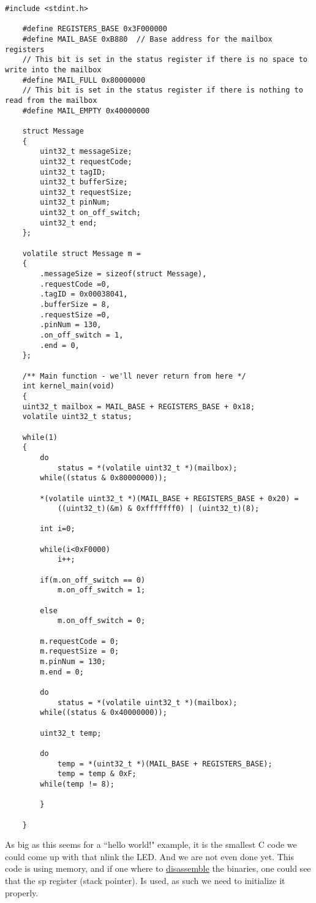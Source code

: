 \documentclass[12pt]{book}
\begin{document}
\lstset{language=C}
\begin{lstlisting}[style=C]
	#include <stdint.h>
	
	#define REGISTERS_BASE 0x3F000000
	#define MAIL_BASE 0xB880  // Base address for the mailbox registers
	// This bit is set in the status register if there is no space to write into the mailbox
	#define MAIL_FULL 0x80000000
	// This bit is set in the status register if there is nothing to read from the mailbox
	#define MAIL_EMPTY 0x40000000
	
	struct Message
	{
		uint32_t messageSize;
		uint32_t requestCode;
		uint32_t tagID;
		uint32_t bufferSize;
		uint32_t requestSize;
		uint32_t pinNum;
		uint32_t on_off_switch;
		uint32_t end;
	};
	
	volatile struct Message m =
	{
		.messageSize = sizeof(struct Message),
		.requestCode =0,
		.tagID = 0x00038041,
		.bufferSize = 8,
		.requestSize =0,
		.pinNum = 130,
		.on_off_switch = 1,
		.end = 0,
	};
	
	/** Main function - we'll never return from here */
	int kernel_main(void)
	{
	uint32_t mailbox = MAIL_BASE + REGISTERS_BASE + 0x18;
	volatile uint32_t status;
	
	while(1)
	{
		do
			status = *(volatile uint32_t *)(mailbox);
		while((status & 0x80000000));
		
		*(volatile uint32_t *)(MAIL_BASE + REGISTERS_BASE + 0x20) = 
			((uint32_t)(&m) & 0xfffffff0) | (uint32_t)(8);
		
		int i=0;
		
		while(i<0xF0000)
			i++;
		
		if(m.on_off_switch == 0)
			m.on_off_switch = 1;
		
		else
			m.on_off_switch = 0;
		
		m.requestCode = 0;
		m.requestSize = 0;
		m.pinNum = 130;
		m.end = 0;
		
		do
			status = *(volatile uint32_t *)(mailbox);
		while((status & 0x40000000));
		
		uint32_t temp;
		
		do
			temp = *(uint32_t *)(MAIL_BASE + REGISTERS_BASE);
			temp = temp & 0xF;
		while(temp != 8);
		
		}
	
	}
\end{lstlisting}


As big as this seems for a ``hello world!" example, it is the smallest C code we could come up with that nlink the LED. And we are not even done yet. This code is using memory, and if one where to \hyperlink{dissassemble}{disassemble} the binaries, one could see that the sp register (stack pointer). Is used, as such we need to initialize it properly.
\end{document}
